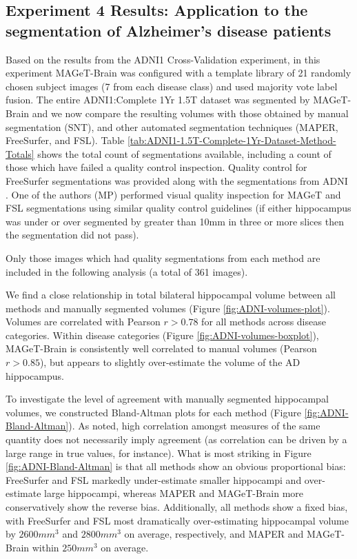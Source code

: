 \documentclass{article}\usepackage{graphicx, color}
\newcommand{\mb}{MAGeT-Brain }
\newcommand{\adnidataset}{ADNI1:Complete 1Yr 1.5T }
\begin{document}
\subsection{Experiment 4 Results: Application to the segmentation of Alzheimer's
disease patients}

Based on the results from the ADNI1 Cross-Validation experiment, in this
experiment \mb was configured with a template library of 21 randomly chosen
subject images (7 from each disease class) and used majority vote label fusion.
The entire \adnidataset dataset was segmented by \mb and we now compare the
resulting volumes with those obtained by manual segmentation (SNT), and other
automated segmentation techniques (MAPER, FreeSurfer, and FSL).  Table
\ref{tab:ADNI1-1.5T-Complete-1Yr-Dataset-Method-Totals} shows the total count of
segmentations available, including a count of those which have failed a quality
control inspection. Quality control for FreeSurfer segmentations was provided along
with the segmentations from ADNI \cite{Hartig2010}. One of the authors (MP) 
performed visual quality inspection for MAGeT and FSL segmentations using similar 
quality control guidelines (if either hippocampus was under or over segmented
by greater than 10mm in three or more slices then the segmentation did not pass). 

Only those images which had quality segmentations from each method are 
included in the following analysis (a total of 361
images).
 
We find a close relationship in total bilateral hippocampal volume between
all methods and manually segmented volumes (Figure \ref{fig:ADNI-volumes-plot}). 
Volumes are correlated with Pearson $r > 0.78$ for all methods across disease
categories.  Within disease categories (Figure \ref{fig:ADNI-volumes-boxplot}),
\mb is consistently well correlated to manual volumes (Pearson $r > 0.85$), but
appears to slightly over-estimate the volume of the AD hippocampus. 

To investigate the level of agreement with manually segmented hippocampal
volumes, we constructed Bland-Altman plots for each method (Figure
\ref{fig:ADNI-Bland-Altman}).  As \citet{Bland1986} noted, high correlation
amongst measures of the same quantity does not necessarily imply agreement (as
correlation can be driven by a large range in true values, for instance).  What
is most striking in Figure \ref{fig:ADNI-Bland-Altman} is that all methods show
an obvious proportional bias: FreeSurfer and FSL markedly under-estimate smaller
hippocampi and over-estimate large hippocampi, whereas MAPER and \mb more
conservatively show the reverse bias.  Additionally, all methods show a fixed
bias, with FreeSurfer and FSL most dramatically over-estimating hippocampal
volume by $2600 mm^3$ and $2800 mm^3$ on average, respectively, and MAPER and
\mb within $250 mm^3$ on average. 
\end{document}
